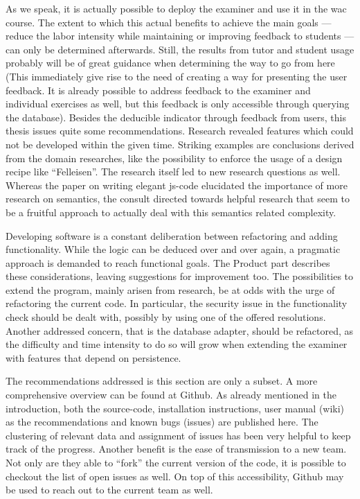 As we speak, it is actually possible to deploy the \gls{examiner} and use it in 
the \gls{wac} course. The extent to which this actual benefits to achieve 
the main goals
--- reduce the labor intensity while maintaining or improving feedback to 
students --- can only be determined afterwards. Still, the results from 
\gls{tutor} and \gls{student} usage probably will be of great guidance when 
determining the way to go from here (This immediately give rise to the need of
creating a way for presenting the user feedback. It is already possible to
address feedback to the \gls{examiner} and individual \glspl{exercise} as well,
but this feedback is only accessible through querying the database).
Besides the deducible indicator through feedback from users, this 
thesis issues quite some recommendations. Research revealed
features which could not be developed within the given time. Striking
examples are conclusions derived from the domain researches, like the possibility
to enforce the usage of a design recipe like ``Felleisen''. The research itself
led to new research questions as well. Whereas the paper on writing elegant
\gls{js-code} elucidated the importance of more research on semantics, the
consult directed towards helpful research that seem to be a fruitful approach
to actually deal with this semantics related complexity.


Developing software is a constant deliberation between refactoring and adding
functionality. While the logic can be deduced over and over again, a pragmatic
approach is demanded to reach functional goals. The Product part describes these
considerations, leaving suggestions for improvement too. The possibilities to
extend the program, mainly arisen from research, be at odds with the urge of
refactoring the current code. In particular, the security issue in the 
functionality check should be dealt with, possibly by using one of the offered
resolutions. Another addressed concern, that is the database adapter, should be
refactored, as the difficulty and time intensity to do so will grow when extending
the \gls{examiner} with features that depend on persistence.


The recommendations addressed is this section are only a subset. A more 
comprehensive overview can be found at Github. As already mentioned in the 
introduction, both the \gls{source-code}, 
installation instructions, user manual (wiki) as the recommendations and known 
bugs (issues) are published here. The clustering of relevant data and assignment
of issues has been very helpful to keep track of the progress. Another benefit 
is the ease of transmission to a new team. Not only are they able to ``fork'' 
the current version of the code, it is possible to checkout the list of 
open issues as well. On top of this accessibility, Github may be used to reach
out to the current team as well.


